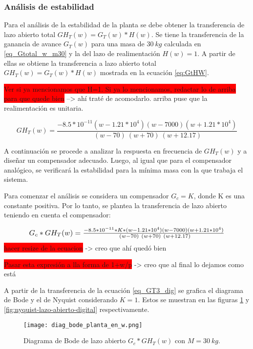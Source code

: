 \subsubsection{Análisis de estabilidad}

 Para el análisis de la estabilidad de la planta se debe obtener la transferencia de lazo abierto total $GH_T(w)=G_T(w)*H(w)$. Se tiene la transferencia de la ganancia de avance $G_{T}(w)$ para una masa de $30\:kg$ calculada en \ref{eq_Gtotal_w_m30} y la del lazo de realimentación $H(w)=1$. A partir de ellas se obtiene la transferencia a lazo abierto total $GH_{T}(w)=G_{T}(w)*H(w)$ mostrada en la ecuación \ref{eq:GtHW}.

\colorbox{red}{Ver si ya mencionamos que H=1. Si ya lo mencionamos, redactar lo de arriba para que quede bien} --> ahí traté de acomodarlo. arriba puse que la realimentación es unitaria.
 
\begin{equation}
	\label{eq:GtHW}  
	GH_{T}(w)=\frac{-8.5*10^{-11}(w-1.21*10^4)(w-7000)(w+1.21*10^4)}{\ (w-70)\ (w+70)\ (w+12.17)} 
\end{equation} 


 A continuación se procede a analizar la respuesta en frecuencia de $GH_{T}(w)$ y a diseñar un compensador adecuado. Luego, al igual que para el compensador analógico, se verificará la estabilidad para la mínima masa  con la  que trabaja el sistema.
 
Para comenzar el análisis se considera un compensador $G_c=K$, donde K es una constante positiva. Por lo tanto, se plantea la transferencia de lazo abierto teniendo en cuenta el compensador:
 
 \begin{equation} \label{eq_GT3_dig}
 		\resizebox{.85\hsize}{!}
 	{
 	$G_c*GH_T(w)=\frac{-8.5*10^{-11}*K*(w-1.21*10^4)(w-7000)(w+1.21*10^4)}{\ (w-70)\ (w+70)\ (w+12.17)}$ 
 }
 \end{equation}
\colorbox{red}{hacer resize de la ecuacion} -> creo que ahí quedó bien

\colorbox{red}{Pasar esta expresión a lla forma de 1+w/p} -> creo que al final lo dejamos como está

 A partir de la transferencia de la ecuación  \ref{eq_GT3_dig} se  grafica el diagrama de Bode y el de Nyquist considerando $K=1$. Estos se muestran en las figuras \ref{fig:bode_digital} y \ref{fig:nyquist-lazo-abierto-digital} respectivamente.

\begin{figure}[H]
	\centering
	\texttt{[image: diag\_bode\_planta\_en\_w.png]}
	\caption{Diagrama de Bode de lazo abierto $G_c*GH_{T}(w)$ con $M=30\:kg$.}
	\label{fig:bode_digital}
\end{figure}

